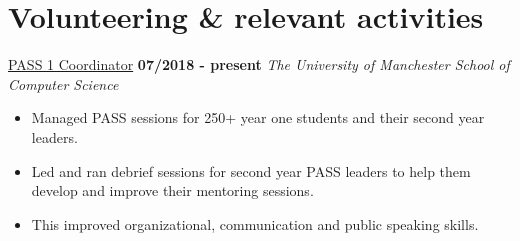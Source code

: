 \documentclass[]{friggeri-cv}
\begin{document}

\section{\color{red}Volunteering \color{gray} \& relevant activities}
\entry
    {}
    {\href{http://www.pass.manchester.ac.uk/}{PASS 1 Coordinator}}
    {\textbf{07/2018 - present}}
    {\emph{The University of Manchester School of Computer Science}}
    \begin{itemize}
        \item Managed PASS sessions for 250+ year one students and their second year leaders.
        \item Led and ran debrief sessions for second year PASS leaders to help them develop and improve their mentoring sessions.
        \item This improved organizational, communication and public speaking skills.\\
    \end{itemize}
\end{document}
